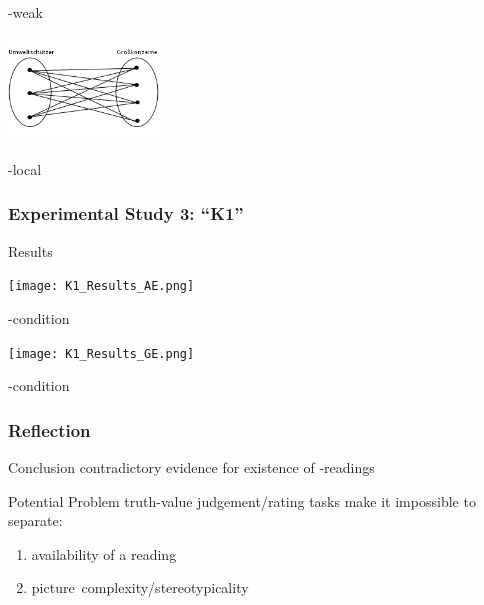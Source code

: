 \documentclass[fleqn,10pt,serif,xcolor=dvipsnames]{beamer}
\newcommand{\loc}{\acro{loc}}
\begin{document}
\begin{frame}
\begin{minipage}[t]{0.35\linewidth}
\begin{flushright}
      \vspace{-0.7cm}
      \begin{center}
        -weak
      \end{center}
      \includegraphics[width=4cm]{./../../pictures/Umweltschuetzer06.PNG}
      \vspace{-0.7cm}
      \begin{center}
        -local
      \end{center}
    \end{flushright}
  \end{minipage}
\end{frame}


\begin{frame}
  \frametitle{Experimental Study 3: ``K1''}
  \begin{block}{Results}
    \begin{minipage}[t]{0.45\linewidth}
      \vspace{0cm}
      \texttt{[image: K1\_Results\_AE.png]}
      \vspace{-0.6cm}
      \begin{center}
        -condition
      \end{center}
    \end{minipage}
    \hspace{0.3cm}
    \begin{minipage}[t]{0.45\linewidth}
      \vspace{0cm}
      \texttt{[image: K1\_Results\_GE.png]}
      \vspace{-0.6cm}
      \begin{center}
        -condition
      \end{center}
    \end{minipage}
  \end{block}
\end{frame}

\begin{frame}
  \frametitle{Reflection}
  
  \begin{block}{Conclusion}
    contradictory evidence for existence of \loc-readings
  \end{block}
  
  \begin{block}{Potential Problem}
    truth-value judgement/rating tasks make it impossible to separate:
      \begin{enumerate}
      \item availability of a reading
      \item picture~complexity/stereotypicality
      \end{enumerate}

  \end{block}

\end{frame}
\end{document}
